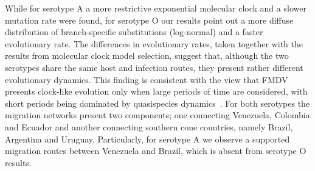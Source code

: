 \documentclass[10pt]{article}
\begin{document}
While for serotype A a more restrictive exponential molecular clock and a slower mutation rate were found, for serotype O our results point out a more diffuse distribution of branch-specific substitutions (log-normal) and a faster evolutionary rate.
The differences in evolutionary rates, taken together with the results from molecular clock model selection, suggest that, although the two serotypes share the same host and infection routes, they present rather different evolutionary dynamics. 
This finding is consistent with the view that FMDV presents clock-like evolution only when large periods of time are considered, with short periods being dominated by quasispecies dynamics~\cite{Muellner2011}.
For both serotypes the migration networks present two components; one connecting Venezuela, Colombia and Ecuador and another connecting southern cone countries, namely Brazil, Argentina and Uruguay.
Particularly, for serotype A we observe a supported migration routes between Venezuela and Brazil, which is absent from serotype O results.
\end{document}
